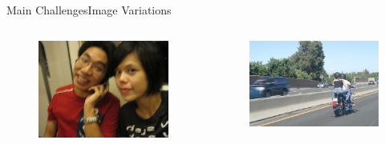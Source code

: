 \begin{frame}{Main Challenges}{Image Variations}
\begin{columns}
        \begin{figure}
            \includegraphics[width=0.7 \textwidth]{figs/000323.jpg}
        \end{figure}
        \begin{figure}
            \includegraphics[width=0.7 \textwidth]{figs/000579.jpg}
        \end{figure}

    \end{columns}
\end{frame}

